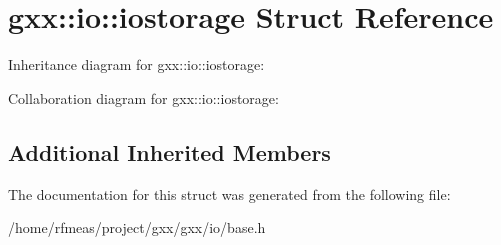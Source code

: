 \hypertarget{structgxx_1_1io_1_1iostorage}{}\section{gxx\+:\+:io\+:\+:iostorage Struct Reference}
\label{structgxx_1_1io_1_1iostorage}


Inheritance diagram for gxx\+:\+:io\+:\+:iostorage\+:


Collaboration diagram for gxx\+:\+:io\+:\+:iostorage\+:
\subsection*{Additional Inherited Members}


The documentation for this struct was generated from the following file\+:\begin{DoxyCompactItemize}
\item 
/home/rfmeas/project/gxx/gxx/io/base.\+h\end{DoxyCompactItemize}
